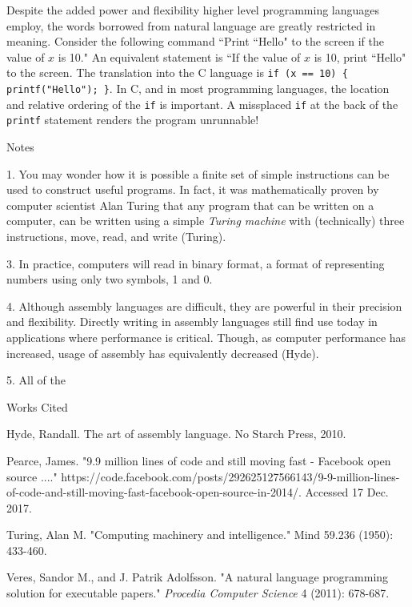 \documentclass[12pt]{article}
\newcommand{\bibent}{\noindent \hangindent 40pt}
\newenvironment{workscited}{\newpage \begin{center} Works Cited \end{center}}{\newpage }
\begin{document}
\begin{flushleft}
Despite the added power and flexibility higher level programming languages employ,
the words borrowed from natural language are greatly restricted in meaning. Consider
the following command ``Print ``Hello" to the screen if the value of $x$ is
10." An equivalent statement is ``If the value of $x$ is 10, print ``Hello"
to the screen.
The translation into the C language is \verb|if (x == 10) { printf("Hello"); }|.
In C, and in most programming languages, the location and relative ordering
of the \verb|if| is important. A missplaced \verb|if| at the back of the
\verb|printf| statement renders the program unrunnable!

\newpage

\begin{center}
Notes
\end{center}

1. You may wonder how it is possible a finite set of simple instructions
can be used to construct useful programs. In fact, it was mathematically proven
by computer scientist Alan Turing that any program that can be written on a computer, can be written using
a simple \textit{Turing machine} with (technically) three instructions, move,
read, and write (Turing).

3. In practice, computers will read in binary format, a format of representing
numbers using only two symbols, 1 and 0.

4. Although assembly languages are difficult, they are powerful in their
precision and flexibility. Directly writing in assembly languages
still find use today in applications where performance is critical. Though,
as computer performance has increased, usage of assembly has equivalently
decreased (Hyde).

5. All of the 

\setlength{\parindent}{0.5in}


\begin{workscited}

\bibent
Hyde, Randall. The art of assembly language. No Starch Press, 2010.

\bibent
Pearce, James. "9.9 million lines of code and still moving fast - Facebook open source ...." https://code.facebook.com/posts/292625127566143/9-9-million-lines-of-code-and-still-moving-fast-facebook-open-source-in-2014/. Accessed 17 Dec. 2017.

\bibent
Turing, Alan M. "Computing machinery and intelligence." Mind 59.236 (1950): 433-460.

\bibent
Veres, Sandor M., and J. Patrik Adolfsson. "A natural language programming solution for executable papers." \textit{Procedia Computer Science} 4 (2011): 678-687.

\end{workscited}

\end{flushleft}
\end{document}
